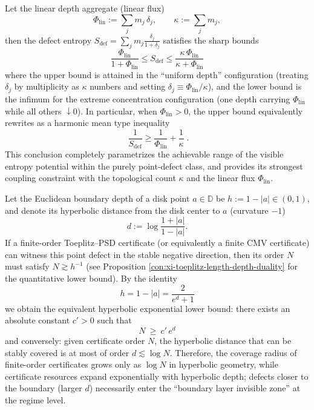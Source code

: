 \begin{proposition}
Let the linear depth aggregate (linear flux)
\[
\Phi_{\mathrm{lin}}:=\sum_{j}m_j\,\delta_j,
\qquad
\kappa:=\sum_{j}m_j,
\]
then the defect entropy \(S_{\mathrm{def}}=\sum_j m_j\frac{\delta_j}{1+\delta_j}\) satisfies the sharp bounds
\[
\boxed{\;
\frac{\Phi_{\mathrm{lin}}}{1+\Phi_{\mathrm{lin}}}
\le
S_{\mathrm{def}}
\le
\frac{\kappa\,\Phi_{\mathrm{lin}}}{\kappa+\Phi_{\mathrm{lin}}}\;}
\]
where the upper bound is attained in the ``uniform depth'' configuration (treating \(\delta_j\) by multiplicity as \(\kappa\) numbers and setting \(\delta_j\equiv \Phi_{\mathrm{lin}}/\kappa\)), and the lower bound is the infimum for the extreme concentration configuration (one depth carrying \(\Phi_{\mathrm{lin}}\) while all others \(\downarrow 0\)).
In particular, when \(\Phi_{\mathrm{lin}}>0\), the upper bound equivalently rewrites as a harmonic mean type inequality
\[
\boxed{\;
\frac{1}{S_{\mathrm{def}}}\ge \frac{1}{\Phi_{\mathrm{lin}}}+\frac{1}{\kappa}\; }.
\]
This conclusion completely parametrizes the achievable range of the visible entropy potential within the purely point-defect class, and provides its strongest coupling constraint with the topological count \(\kappa\) and the linear flux \(\Phi_{\mathrm{lin}}\).
\end{proposition}

\begin{proposition}
Let the Euclidean boundary depth of a disk point \(a\in\mathbb{D}\) be \(h:=1-|a|\in(0,1)\), and denote its hyperbolic distance from the disk center to \(a\) (curvature \(-1\))
\[
d:=\log\frac{1+|a|}{1-|a|}.
\]
If a finite-order Toeplitz--PSD certificate (or equivalently a finite CMV certificate) can witness this point defect in the stable negative direction, then its order \(N\) must satisfy \(N\gtrsim h^{-1}\) (see Proposition \ref{con:xi-toeplitz-length-depth-duality} for the quantitative lower bound).
By the identity
\[
h=1-|a|
=\frac{2}{e^{d}+1}
\]
we obtain the equivalent hyperbolic exponential lower bound: there exists an absolute constant \(c'>0\) such that
\[
\boxed{\;
N\ \ge\ c'\,e^{d}\;}
\]
and conversely: given certificate order \(N\), the hyperbolic distance that can be stably covered is at most of order \(d\lesssim \log N\).
Therefore, the coverage radius of finite-order certificates grows only as \(\log N\) in hyperbolic geometry, while certificate resources expand exponentially with hyperbolic depth; defects closer to the boundary (larger \(d\)) necessarily enter the ``boundary layer invisible zone'' at the regime level.
\end{proposition}


